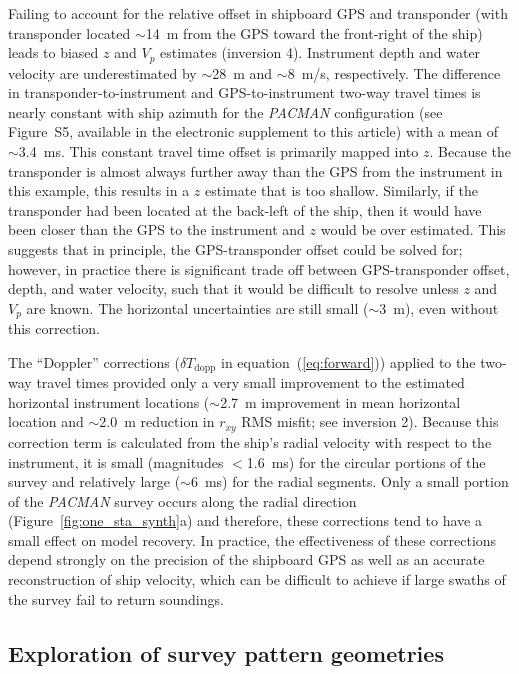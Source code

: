 Failing to account for the relative offset in shipboard GPS and transponder (with transponder located $\sim$14~m from the GPS toward the front-right of the ship) leads to biased $z$ and $V_p$ estimates (inversion 4). Instrument depth and water velocity are underestimated by $\sim$28~m and $\sim$8~m/s, respectively. The difference in transponder-to-instrument and GPS-to-instrument two-way travel times is nearly constant with ship azimuth for the \textit{PACMAN} configuration (see Figure~S5, available in the electronic supplement to this article) with a mean of $\sim$3.4~ms. This constant travel time offset is primarily mapped into $z$. Because the transponder is almost always further away than the GPS from the instrument in this example, this results in a $z$ estimate that is too shallow. Similarly, if the transponder had been located at the back-left of the ship, then it would have been closer than the GPS to the instrument and $z$ would be over estimated. This suggests that in principle, the GPS-transponder offset could be solved for; however, in practice there is significant trade off between GPS-transponder offset, depth, and water velocity, such that it would be difficult to resolve unless $z$ and $V_p$ are known. The horizontal uncertainties are still small ($\sim$3~m), even without this correction.

The ``Doppler'' corrections ($\delta T_{\text{dopp}}$ in equation~(\ref{eq:forward})) applied to the two-way travel times provided only a very small improvement to the estimated horizontal instrument locations ($\sim$2.7~m improvement in mean horizontal location and $\sim$2.0~m reduction in $r_{xy}$ RMS misfit; see inversion 2). Because this correction term is calculated from the ship's radial velocity with respect to the instrument, it is small (magnitudes $<$1.6~ms) for the circular portions of the survey and relatively large ($\sim$6~ms) for the radial segments. Only a small portion of the \textit{PACMAN} survey occurs along the radial direction (Figure~\ref{fig:one_sta_synth}a) and therefore, these corrections tend to have a small effect on model recovery. In practice, the effectiveness of these corrections depend strongly on the precision of the shipboard GPS as well as an accurate reconstruction of ship velocity, which can be difficult to achieve if large swaths of the survey fail to return soundings.


\subsection{Exploration of survey pattern geometries} \label{sec:surv_geom_tests}

